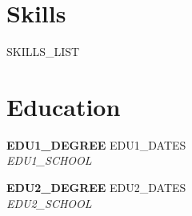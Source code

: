\documentclass[10pt, letterpaper]{article}
\newcommand{\educationentry}[3]{
  \textbf{#1} \hfill #3 \\
  \textit{#2}
  \vspace{2pt}
}
\begin{document}
\section{Skills}
{{SKILLS_LIST}}

\section{Education}

\educationentry{ {{EDU1_DEGREE}} }{ {{EDU1_SCHOOL}} }{ {{EDU1_DATES}} }

\educationentry{ {{EDU2_DEGREE}} }{ {{EDU2_SCHOOL}} }{ {{EDU2_DATES}} }
\end{document}
